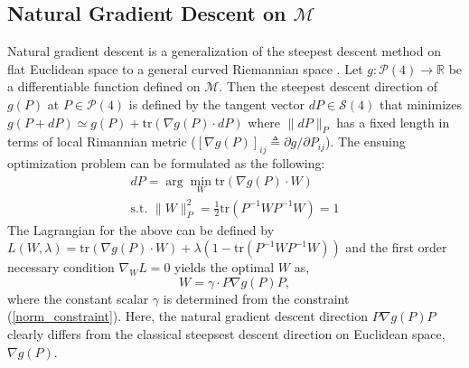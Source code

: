 \documentclass[letterpaper, 10 pt, conference]{ieeeconf}  %
\begin{document}
\subsection{Natural Gradient Descent on $\mathcal{M}$}
Natural gradient descent is a generalization of the steepest descent method on flat Euclidean space to a general curved Riemannian space \cite{Amari_Naturalgrad}. Let $g : \mathcal{P}(4) \rightarrow \mathbb{R}$ be a differentiable function defined on $\mathcal{M}$. Then the steepest descent direction of $g(P)$ at $P\in\mathcal{P}(4)$ is defined by the tangent vector $dP\in\mathcal{S}(4)$ that minimizes $g(P+dP) \simeq g(P) + \mathrm{tr}(\nabla g(P)\cdot dP)$ where $\|dP\|_{P}$ has a fixed length in terms of local Rimannian metric ($[\nabla g(P)]_{ij} \triangleq \partial g/\partial P_{ij}$). The ensuing optimization problem can be formulated as the following:
\begin{gather}
dP = \arg\min_{W} \mathrm{tr}(\nabla g(P)\cdot W) \\
 \text{s.t. } \|W\|_{P}^2= \frac{1}{2}\mathrm{tr}(P^{-1}WP^{-1}W) = 1 \label{norm_constraint}
\end{gather}
The Lagrangian for the above can be defined by $L(W, \lambda) = \mathrm{tr}(\nabla g(P)\cdot W) + \lambda(1- \mathrm{tr}(P^{-1}WP^{-1}W))$ and the first order necessary condition $\nabla_{W}L = 0$ yields the optimal $W$ as,
\begin{equation}
W = \gamma \cdot P\nabla g(P) P, \label{natural_gradient_direction}
\end{equation}
where the constant scalar $\gamma$ is determined from the constraint (\ref{norm_constraint}). Here, the natural gradient descent direction $P\nabla g(P) P$ clearly differs from the classical steepsest descent direction on Euclidean space, $\nabla g(P)$.
\end{document}
